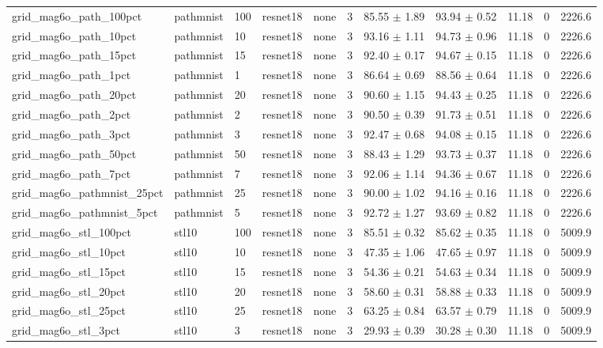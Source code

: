 \begin{tabular}{lllllllllll}
grid_mag6o_path_100pct & pathmnist & 100 & resnet18 & none & 3 & 85.55 $\pm$ 1.89 & 93.94 $\pm$ 0.52 & 11.18 & 0 & 2226.6 \\
grid_mag6o_path_10pct & pathmnist & 10 & resnet18 & none & 3 & 93.16 $\pm$ 1.11 & 94.73 $\pm$ 0.96 & 11.18 & 0 & 2226.6 \\
grid_mag6o_path_15pct & pathmnist & 15 & resnet18 & none & 3 & 92.40 $\pm$ 0.17 & 94.67 $\pm$ 0.15 & 11.18 & 0 & 2226.6 \\
grid_mag6o_path_1pct & pathmnist & 1 & resnet18 & none & 3 & 86.64 $\pm$ 0.69 & 88.56 $\pm$ 0.64 & 11.18 & 0 & 2226.6 \\
grid_mag6o_path_20pct & pathmnist & 20 & resnet18 & none & 3 & 90.60 $\pm$ 1.15 & 94.43 $\pm$ 0.25 & 11.18 & 0 & 2226.6 \\
grid_mag6o_path_2pct & pathmnist & 2 & resnet18 & none & 3 & 90.50 $\pm$ 0.39 & 91.73 $\pm$ 0.51 & 11.18 & 0 & 2226.6 \\
grid_mag6o_path_3pct & pathmnist & 3 & resnet18 & none & 3 & 92.47 $\pm$ 0.68 & 94.08 $\pm$ 0.15 & 11.18 & 0 & 2226.6 \\
grid_mag6o_path_50pct & pathmnist & 50 & resnet18 & none & 3 & 88.43 $\pm$ 1.29 & 93.73 $\pm$ 0.37 & 11.18 & 0 & 2226.6 \\
grid_mag6o_path_7pct & pathmnist & 7 & resnet18 & none & 3 & 92.06 $\pm$ 1.14 & 94.36 $\pm$ 0.67 & 11.18 & 0 & 2226.6 \\
grid_mag6o_pathmnist_25pct & pathmnist & 25 & resnet18 & none & 3 & 90.00 $\pm$ 1.02 & 94.16 $\pm$ 0.16 & 11.18 & 0 & 2226.6 \\
grid_mag6o_pathmnist_5pct & pathmnist & 5 & resnet18 & none & 3 & 92.72 $\pm$ 1.27 & 93.69 $\pm$ 0.82 & 11.18 & 0 & 2226.6 \\
grid_mag6o_stl_100pct & stl10 & 100 & resnet18 & none & 3 & 85.51 $\pm$ 0.32 & 85.62 $\pm$ 0.35 & 11.18 & 0 & 5009.9 \\
grid_mag6o_stl_10pct & stl10 & 10 & resnet18 & none & 3 & 47.35 $\pm$ 1.06 & 47.65 $\pm$ 0.97 & 11.18 & 0 & 5009.9 \\
grid_mag6o_stl_15pct & stl10 & 15 & resnet18 & none & 3 & 54.36 $\pm$ 0.21 & 54.63 $\pm$ 0.34 & 11.18 & 0 & 5009.9 \\
grid_mag6o_stl_20pct & stl10 & 20 & resnet18 & none & 3 & 58.60 $\pm$ 0.31 & 58.88 $\pm$ 0.33 & 11.18 & 0 & 5009.9 \\
grid_mag6o_stl_25pct & stl10 & 25 & resnet18 & none & 3 & 63.25 $\pm$ 0.84 & 63.57 $\pm$ 0.79 & 11.18 & 0 & 5009.9 \\
grid_mag6o_stl_3pct & stl10 & 3 & resnet18 & none & 3 & 29.93 $\pm$ 0.39 & 30.28 $\pm$ 0.30 & 11.18 & 0 & 5009.9 \\

\end{tabular}
